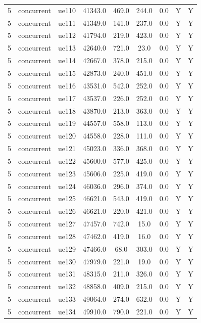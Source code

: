 \begin{table}[ht]
\begin{tabular}{|c|c|c|c|c|c|c|c|c|}
5 & concurrent & ue110 & 41343.0 & 469.0 & 244.0 & 0.0 & Y & Y \\
5 & concurrent & ue111 & 41349.0 & 141.0 & 237.0 & 0.0 & Y & Y \\
5 & concurrent & ue112 & 41794.0 & 219.0 & 423.0 & 0.0 & Y & Y \\
5 & concurrent & ue113 & 42640.0 & 721.0 & 23.0 & 0.0 & Y & Y \\
5 & concurrent & ue114 & 42667.0 & 378.0 & 215.0 & 0.0 & Y & Y \\
5 & concurrent & ue115 & 42873.0 & 240.0 & 451.0 & 0.0 & Y & Y \\
5 & concurrent & ue116 & 43531.0 & 542.0 & 252.0 & 0.0 & Y & Y \\
5 & concurrent & ue117 & 43537.0 & 226.0 & 252.0 & 0.0 & Y & Y \\
5 & concurrent & ue118 & 43870.0 & 213.0 & 363.0 & 0.0 & Y & Y \\
5 & concurrent & ue119 & 44557.0 & 558.0 & 113.0 & 0.0 & Y & Y \\
5 & concurrent & ue120 & 44558.0 & 228.0 & 111.0 & 0.0 & Y & Y \\
5 & concurrent & ue121 & 45023.0 & 336.0 & 368.0 & 0.0 & Y & Y \\
5 & concurrent & ue122 & 45600.0 & 577.0 & 425.0 & 0.0 & Y & Y \\
5 & concurrent & ue123 & 45606.0 & 225.0 & 419.0 & 0.0 & Y & Y \\
5 & concurrent & ue124 & 46036.0 & 296.0 & 374.0 & 0.0 & Y & Y \\
5 & concurrent & ue125 & 46621.0 & 543.0 & 419.0 & 0.0 & Y & Y \\
5 & concurrent & ue126 & 46621.0 & 220.0 & 421.0 & 0.0 & Y & Y \\
5 & concurrent & ue127 & 47457.0 & 742.0 & 15.0 & 0.0 & Y & Y \\
5 & concurrent & ue128 & 47462.0 & 419.0 & 16.0 & 0.0 & Y & Y \\
5 & concurrent & ue129 & 47466.0 & 68.0 & 303.0 & 0.0 & Y & Y \\
5 & concurrent & ue130 & 47979.0 & 221.0 & 19.0 & 0.0 & Y & Y \\
5 & concurrent & ue131 & 48315.0 & 211.0 & 326.0 & 0.0 & Y & Y \\
5 & concurrent & ue132 & 48858.0 & 409.0 & 215.0 & 0.0 & Y & Y \\
5 & concurrent & ue133 & 49064.0 & 274.0 & 632.0 & 0.0 & Y & Y \\
5 & concurrent & ue134 & 49910.0 & 790.0 & 221.0 & 0.0 & Y & Y \\

\end{tabular}
\end{table}
